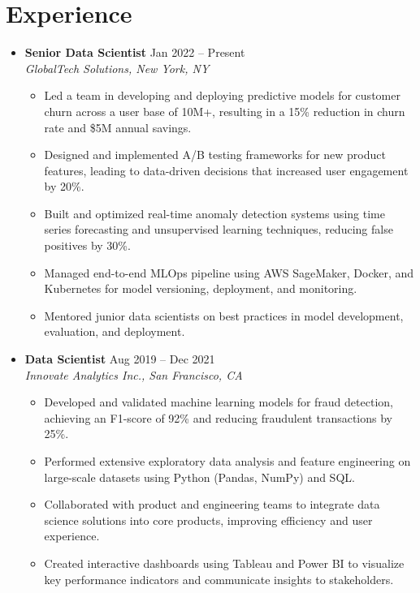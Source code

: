 \documentclass[10pt]{article} %
\newenvironment{resumelist}{
    \begin{itemize}[label=\textbullet, leftmargin=1em, noitemsep, topsep=2pt, parsep=0pt, partopsep=0pt]
}{
    \end{itemize}
}
\begin{document}
\section*{Experience}
\begin{itemize}[leftmargin=*, label={}]%
\item \textbf{Senior Data Scientist} \hfill Jan 2022 -- Present \\
    \textit{GlobalTech Solutions, New York, NY}
    \begin{resumelist} %
\item Led a team in developing and deploying predictive models for customer churn across a user base of 10M+, resulting in a 15\% reduction in churn rate and \$5M annual savings.
\item Designed and implemented A/B testing frameworks for new product features, leading to data-driven decisions that increased user engagement by 20\%.
\item Built and optimized real-time anomaly detection systems using time series forecasting and unsupervised learning techniques, reducing false positives by 30\%.
\item Managed end-to-end MLOps pipeline using AWS SageMaker, Docker, and Kubernetes for model versioning, deployment, and monitoring.
\item Mentored junior data scientists on best practices in model development, evaluation, and deployment.
    \end{resumelist}
\item \textbf{Data Scientist} \hfill Aug 2019 -- Dec 2021 \\
    \textit{Innovate Analytics Inc., San Francisco, CA}
    \begin{resumelist}
\item Developed and validated machine learning models for fraud detection, achieving an F1-score of 92\% and reducing fraudulent transactions by 25\%.
\item Performed extensive exploratory data analysis and feature engineering on large-scale datasets using Python (Pandas, NumPy) and SQL.
\item Collaborated with product and engineering teams to integrate data science solutions into core products, improving efficiency and user experience.
\item Created interactive dashboards using Tableau and Power BI to visualize key performance indicators and communicate insights to stakeholders.

\end{resumelist}
\end{itemize}
\end{document}
